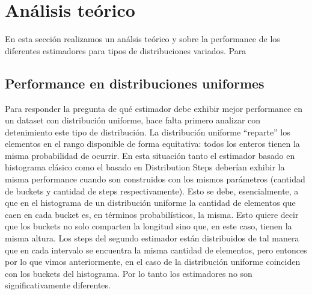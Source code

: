 \section{Análisis teórico}
En esta sección realizamos un análsis teórico y sobre la performance de los diferentes estimadores para tipos de distribuciones variados. Para 

\subsection{Performance en distribuciones uniformes}
Para responder la pregunta de qué estimador debe exhibir mejor performance en un dataset con distribución uniforme, hace falta primero analizar con detenimiento este tipo de distribución. La distribución uniforme ``reparte'' los elementos en el rango disponible de forma equitativa: todos los enteros tienen la misma probabilidad de ocurrir. En esta situación tanto el estimador basado en histograma clásico como el basado en Distribution Steps deberían exhibir la misma performance cuando son construidos con los mismos parámetros (cantidad de buckets y cantidad de steps respectivamente). Esto se debe, esencialmente, a que en el histograma de un distribución uniforme la cantidad de elementos que caen en cada bucket es, en términos probabilísticos, la misma. Esto quiere decir que los buckets no solo comparten la longitud sino que, en este caso, tienen la misma altura. Los steps del segundo estimador están distribuidos de tal manera que en cada intervalo se encuentra la misma cantidad de elementos, pero entonces por lo que vimos anteriormente, en el caso de la distribución uniforme coinciden con los buckets del histograma. Por lo tanto los estimadores no son significativamente diferentes.

